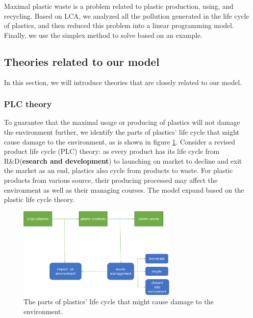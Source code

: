 \documentclass{mcmthesis}
\begin{document}

Maximal plastic waste is a problem related to plastic production, using, and recycling. Based on LCA, we analyzed all the pollution generated in the life cycle of plastics, and then reduced this problem into a linear programming model. Finally, we use the simplex method to solve based on an example.

\subsection{Theories related to our model}

In this section, we will introduce theories that are closely related to our model.


\subsubsection{PLC theory}

To guarantee that the maximal usage or producing of plastics will not damage the environment further, we identify the parts of plastics’ life cycle that might cause damage to the environment, as is shown in figure \ref{fig4}. Consider a revised product life cycle (PLC) theory: as every product has its life cycle from R\&D(\textbf{esearch and development}) to launching on market to decline and exit the market as an end, plastics also cycle from products to waste. For plastic products from various source, their producing processed may affect the environment as well as their managing courses. The model expand based on the plastic life cycle theory. 

\begin{figure}[!htb] %
	\centering %
	\includegraphics[width=0.7\textwidth]{figures/PCL.png} %
	\caption{The parts of plastics’ life cycle that might cause damage to the environment.} %
	\label{fig4} %
	
\end{figure}
\end{document}
